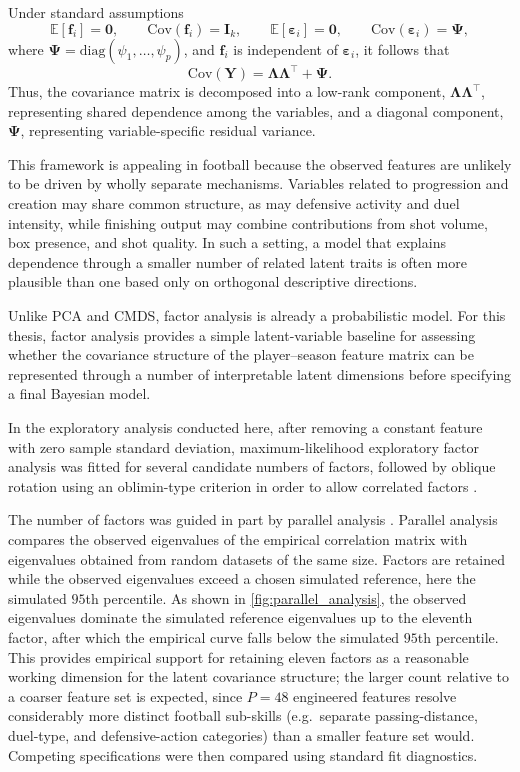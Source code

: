 Under standard assumptions
\[
\mathbb{E}[\mathbf{f}_i]=\mathbf{0}, \qquad
\mathrm{Cov}(\mathbf{f}_i)=\mathbf{I}_k, \qquad
\mathbb{E}[\boldsymbol{\varepsilon}_i]=\mathbf{0}, \qquad
\mathrm{Cov}(\boldsymbol{\varepsilon}_i)=\mathbf{\Psi},
\]
where \(\mathbf{\Psi}=\mathrm{diag}(\psi_1,\ldots,\psi_p)\), and \(\mathbf{f}_i\) is independent of \(\boldsymbol{\varepsilon}_i\), it follows that
\[
\mathrm{Cov}(\mathbf{Y})=\mathbf{\Lambda}\mathbf{\Lambda}^\top+\mathbf{\Psi}.
\]
Thus, the covariance matrix is decomposed into a low-rank component, $\mathbf{\Lambda}\mathbf{\Lambda}^\top$, representing shared dependence among the variables, and a diagonal component, $\mathbf{\Psi}$, representing variable-specific residual variance.

This framework is appealing in football because the observed features are unlikely to be driven by wholly separate mechanisms. Variables related to progression and creation may share common structure, as may defensive activity and duel intensity, while finishing output may combine contributions from shot volume, box presence, and shot quality. In such a setting, a model that explains dependence through a smaller number of related latent traits is often more plausible than one based only on orthogonal descriptive directions.

Unlike PCA and CMDS, factor analysis is already a probabilistic model. For this thesis, factor analysis provides a simple latent-variable baseline for assessing whether the covariance structure of the player--season feature matrix can be represented through a number of interpretable latent dimensions before specifying a final Bayesian model.

In the exploratory analysis conducted here, after removing a constant feature with zero sample standard deviation, maximum-likelihood exploratory factor analysis was fitted for several candidate numbers of factors, followed by oblique rotation using an oblimin-type criterion in order to allow correlated factors \cite{bartholomew2011latent,jennrich1966rotation}.

The number of factors was guided in part by parallel analysis \cite{horn1965parallel}. Parallel analysis compares the observed eigenvalues of the empirical correlation matrix with eigenvalues obtained from random datasets of the same size. Factors are retained while the observed eigenvalues exceed a chosen simulated reference, here the simulated \(95\)th percentile. As shown in \autoref{fig:parallel_analysis}, the observed eigenvalues dominate the simulated reference eigenvalues up to the eleventh factor, after which the empirical curve falls below the simulated $95$th percentile. This provides empirical support for retaining eleven factors as a reasonable working dimension for the latent covariance structure; the larger count relative to a coarser feature set is expected, since \(P=48\) engineered features resolve considerably more distinct football sub-skills (e.g.\ separate passing-distance, duel-type, and defensive-action categories) than a smaller feature set would. Competing specifications were then compared using standard fit diagnostics.


